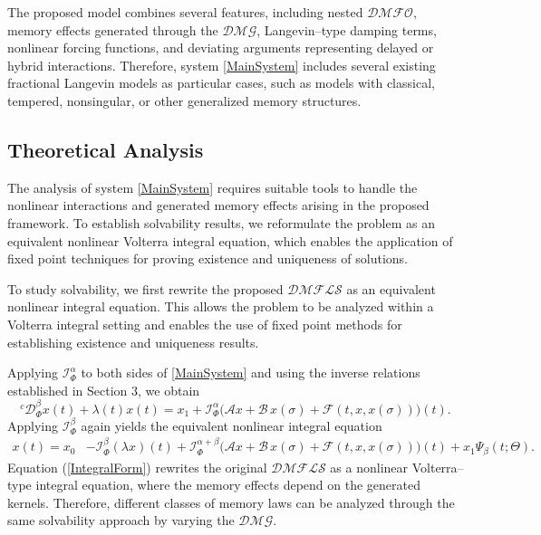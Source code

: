 \documentclass[11pt]{article}
\numberwithin{equation}{section}
\begin{document}
The proposed model combines several features, including nested $\mathcal{DMFO}$, memory effects generated through the $\mathcal{DMG}$,
Langevin--type damping terms, nonlinear forcing functions, and deviating arguments representing delayed or hybrid interactions. Therefore, system \eqref{MainSystem} includes several existing fractional Langevin models as particular cases, such as models with classical, tempered, nonsingular, or other generalized memory structures.
\subsection{Theoretical Analysis}

The analysis of system \eqref{MainSystem} requires suitable tools to handle the nonlinear
interactions and generated memory effects arising in the proposed framework.
To establish solvability results, we reformulate the problem as an equivalent
nonlinear Volterra integral equation, which enables the application of fixed
point techniques for proving existence and uniqueness of solutions.

To study solvability, we first rewrite the proposed $\mathcal{DMFLS}$ as an equivalent nonlinear integral equation. This allows the problem to be analyzed within a Volterra integral setting and enables the use of fixed point methods for establishing existence and uniqueness results.

Applying $\mathcal I_\Phi^\alpha$ to both sides of \eqref{MainSystem} and using the inverse relations established in Section 3, we obtain
\[
{}^{c}\mathcal D_{\Phi}^{\beta}x(t)
+
\lambda(t)x(t)
=
x_{1}
+
\mathcal I_{\Phi}^{\alpha}
\Big(
\mathcal A x
+
\mathcal{B}\,x(\sigma)
+
\mathcal{F}(t,x,x(\sigma))
\Big)(t).
\]
Applying
\(
\mathcal I_{\Phi}^{\beta}
\)
again yields the equivalent nonlinear integral equation
\begin{align}
x(t)
=
x_{0}
&-
\mathcal I_{\Phi}^{\beta}
(\lambda x)(t)
+
\mathcal I_{\Phi}^{\alpha+\beta}
\Big(
\mathcal A x
+
\mathcal{B}\,x(\sigma)
+
\mathcal{F}(t,x,x(\sigma))
\Big)(t)
+
x_{1}\Psi_{\beta}(t;\Theta).
\label{IntegralForm}
\end{align}
Equation (\ref{IntegralForm}) rewrites the original $\mathcal{DMFLS}$ as a nonlinear Volterra--type integral equation, where the memory effects depend on the generated kernels. Therefore, different classes of memory laws can be analyzed through the same solvability approach by varying the $\mathcal{DMG}$.
\end{document}
